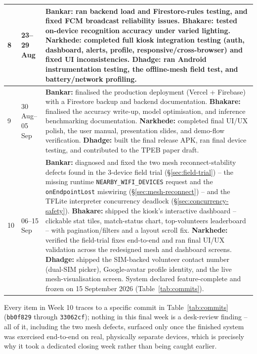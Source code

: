 \documentclass[12pt,a4paper,oneside]{report}
\newcommand{\code}[1]{\texttt{#1}}
\begin{document}
\begin{longtable}{|p{0.9cm}|p{2.1cm}|p{10.7cm}|}
8 & 23--29 Aug &
\textbf{Bankar:} ran backend load and Firestore-rules testing, and fixed FCM broadcast reliability issues.\newline
\textbf{Bhakare:} tested on-device recognition accuracy under varied lighting.\newline
\textbf{Narkhede:} completed full kiosk integration testing (auth, dashboard, alerts, profile, responsive/cross-browser) and fixed UI inconsistencies.\newline
\textbf{Dhadge:} ran Android instrumentation testing, the offline-mesh field test, and battery/network profiling. \\ \hline
9 & 30 Aug--05 Sep &
\textbf{Bankar:} finalised the production deployment (Vercel + Firebase) with a Firestore backup and backend documentation.\newline
\textbf{Bhakare:} finalised the accuracy write-up, model optimisation, and inference benchmarking documentation.\newline
\textbf{Narkhede:} completed final UI/UX polish, the user manual, presentation slides, and demo-flow verification.\newline
\textbf{Dhadge:} built the final release APK, ran final device testing, and contributed to the TPEB paper draft. \\ \hline
10 & 06--15 Sep &
\textbf{Bankar:} diagnosed and fixed the two mesh reconnect-stability defects found in the 3-device field trial (\S\ref{sec:field-trial}) -- the missing runtime \code{NEARBY\_WIFI\_DEVICES} request and the \code{onEndpointLost} miswiring (\S\ref{sec:mesh-reconnect}) -- and the TFLite interpreter concurrency deadlock (\S\ref{sec:concurrency-safety}).\newline
\textbf{Bhakare:} shipped the kiosk's interactive dashboard -- clickable stat tiles, match-status chart, top-volunteers leaderboard -- with pagination/filters and a layout scroll fix.\newline
\textbf{Narkhede:} verified the field-trial fixes end-to-end and ran final UI/UX validation across the redesigned mesh and dashboard screens.\newline
\textbf{Dhadge:} shipped the SIM-backed volunteer contact number (dual-SIM picker), Google-avatar profile identity, and the live mesh-visualisation screen. System declared feature-complete and frozen on 15 September 2026 (Table~\ref{tab:commits}). \\
\hline
\end{longtable}
\normalsize

Every item in Week 10 traces to a specific commit in Table~\ref{tab:commits}
(\texttt{bb0f829} through \texttt{33062cf}); nothing in this final week is a
desk-review finding -- all of it, including the two mesh defects, surfaced
only once the finished system was exercised end-to-end on real, physically
separate devices, which is precisely why it took a dedicated closing week
rather than being caught earlier.
\end{document}
